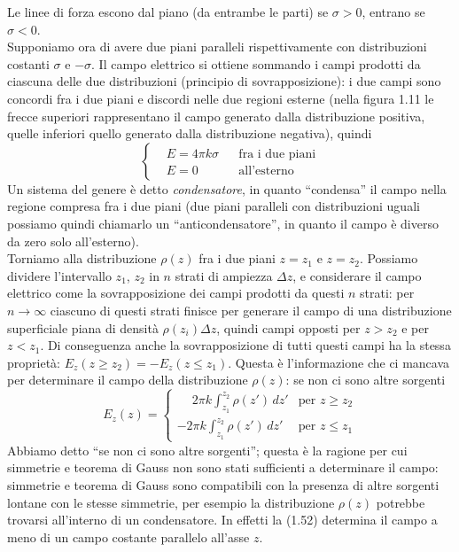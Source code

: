\begin{enumerate}
Le linee di forza escono dal piano (da entrambe le parti) se $\sigma>0$, entrano se $\sigma<0$.\\
Supponiamo ora di avere due piani paralleli rispettivamente con distribuzioni costanti $\sigma$ e $-\sigma$. Il campo elettrico si ottiene sommando i campi prodotti da ciascuna delle due distribuzioni (principio di sovrapposizione): i due campi sono concordi fra i due piani e discordi nelle due regioni esterne (nella figura 1.11 le frecce superiori rappresentano il campo generato dalla distribuzione positiva, quelle inferiori quello generato dalla distribuzione negativa), quindi
\begin{equation}
\left\{\begin{aligned}
&E=4\pi k\sigma&&\text{fra i due piani}\\
&E=0&&\text{all'esterno}
\end{aligned}\right.
\tag{1.56}
\end{equation}
Un sistema del genere è detto \emph{condensatore}, in quanto ``condensa'' il campo nella regione compresa fra i due piani (due piani paralleli con distribuzioni uguali possiamo quindi chiamarlo un ``anticondensatore'', in quanto il campo è diverso da zero solo all'esterno).\\
Torniamo alla distribuzione $\rho(z)$ fra i due piani $z=z_1$ e $z=z_2$. Possiamo dividere l'intervallo $z_1$, $z_2$ in $n$ strati di ampiezza $\Delta z$, e considerare il campo elettrico come la sovrapposizione dei campi prodotti da questi $n$ strati: per $n\to\infty$ ciascuno di questi strati finisce per generare il campo di una distribuzione superficiale piana di densità $\rho(z_i)\Delta z$, quindi campi opposti per $z>z_2$ e per $z<z_1$. Di conseguenza anche la sovrapposizione di tutti questi campi ha la stessa proprietà: $E_z(z\ge z_2)=-E_z(z\le z_1)$. Questa è l'informazione che ci mancava per determinare il campo della distribuzione $\rho(z)$: se non ci sono altre sorgenti
\begin{equation}
E_z(z)=\begin{cases}
\phantom{-}2\pi k\displaystyle\int_{z_1}^{z_2}\rho(z')\,dz'&\text{per }z\ge z_2\\[12pt]
-2\pi k\displaystyle\int_{z_1}^{z_2}\rho(z')\,dz'&\text{per }z\le z_1
\end{cases}
\tag{1.57}
\end{equation}
Abbiamo detto ``se non ci sono altre sorgenti''; questa è la ragione per cui simmetrie e teorema di Gauss non sono stati sufficienti a determinare il campo: simmetrie e teorema di Gauss sono compatibili con la presenza di altre sorgenti lontane con le stesse simmetrie, per esempio la distribuzione $\rho(z)$ potrebbe trovarsi all'interno di un condensatore. In effetti la (1.52) determina il campo a meno di un campo costante parallelo all'asse $z$.
\end{enumerate}
